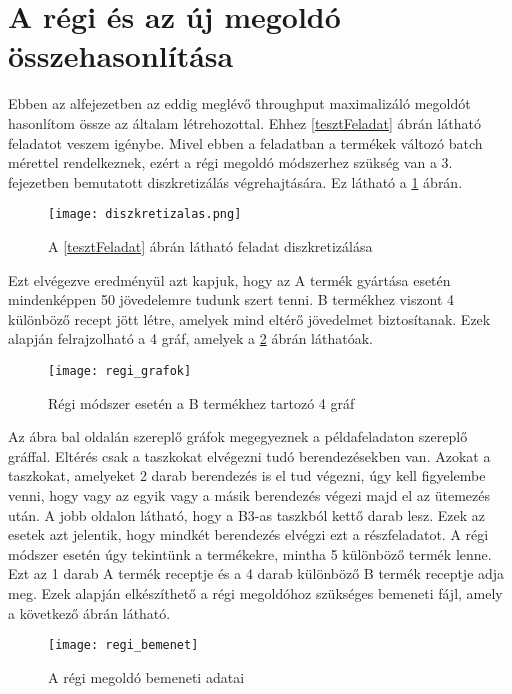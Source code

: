 \section{A régi és az új megoldó összehasonlítása}
Ebben az alfejezetben az eddig meglévő throughput maximalizáló megoldót hasonlítom össze az általam létrehozottal.
Ehhez \ref{tesztFeladat} ábrán látható feladatot veszem igénybe.
Mivel ebben a feladatban a termékek változó batch mérettel rendelkeznek, ezért a régi megoldó módszerhez szükség van a 3. fejezetben bemutatott diszkretizálás végrehajtására.
Ez látható a \ref{diszkretizalas} ábrán.

\begin{figure}[H]
\begin{center}
\texttt{[image: diszkretizalas.png]}
\caption{A \ref{tesztFeladat} ábrán látható feladat diszkretizálása}
\label{diszkretizalas}
\end{center}
\end{figure}

Ezt elvégezve eredményül azt kapjuk, hogy az A termék gyártása esetén mindenképpen 50 jövedelemre tudunk szert tenni.
B termékhez viszont 4 különböző recept jött létre, amelyek mind eltérő jövedelmet biztosítanak.
Ezek alapján felrajzolható a 4 gráf, amelyek a \ref{regi_grafok} ábrán láthatóak.

\begin{figure}[H]
\begin{center}
\texttt{[image: regi\_grafok]}
\caption{Régi módszer esetén a B termékhez tartozó 4 gráf}
\label{regi_grafok}
\end{center}
\end{figure}

Az ábra bal oldalán szereplő gráfok megegyeznek a példafeladaton szereplő gráffal.
Eltérés csak a taszkokat elvégezni tudó berendezésekben van.
Azokat a  taszkokat, amelyeket 2 darab berendezés is el tud végezni, úgy kell figyelembe venni, hogy vagy az egyik vagy a másik berendezés végezi majd el az ütemezés után.
A jobb oldalon látható, hogy a B3-as taszkból kettő darab lesz.
Ezek az esetek azt jelentik, hogy mindkét berendezés elvégzi ezt a részfeladatot.
A régi módszer esetén úgy tekintünk a termékekre, mintha 5 különböző termék lenne.
Ezt az 1 darab A termék receptje és a 4 darab különböző B termék receptje adja meg.
Ezek alapján elkészíthető a régi megoldóhoz szükséges bemeneti fájl, amely a következő ábrán látható. 

\begin{figure}[H]
\begin{center}
\texttt{[image: regi\_bemenet]}
\caption{A régi megoldó bemeneti adatai}
\label{regi_bemenet}
\end{center}
\end{figure}

